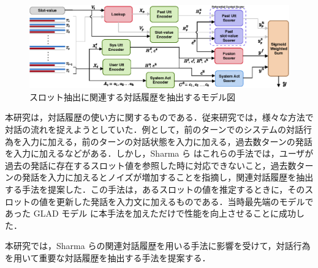 \begin{figure}[thb]
    \begin{center}
      \includegraphics[width=15cm]{chapter4/kanren.eps}
      \caption{スロット抽出に関連する対話履歴を抽出するモデル図}
      \label{fig:kanren}
    \end{center}
\end{figure}

本研究は，対話履歴の使い方に関するものである．従来研究では，様々な方法で対話の流れを捉えようとしていた．例として，前のターンでのシステムの対話行為を入力に加える，前のターンの対話状態を入力に加える，過去数ターンの発話を入力に加えるなどがある．しかし，Sharma ら\cite{kanren} はこれらの手法では，ユーザが過去の発話に存在するスロット値を参照した時に対応できないこと，過去数ターンの発話を入力に加えるとノイズが増加することを指摘し，関連対話履歴を抽出する手法を提案した．この手法は，あるスロットの値を推定するときに，そのスロットの値を更新した発話を入力文に加えるものである．当時最先端のモデルであった GLAD モデル\cite{glad} に本手法を加えただけで性能を向上させることに成功した．
\par
本研究では，Sharma らの関連対話履歴を用いる手法に影響を受けて，対話行為を用いて重要な対話履歴を抽出する手法を提案する．